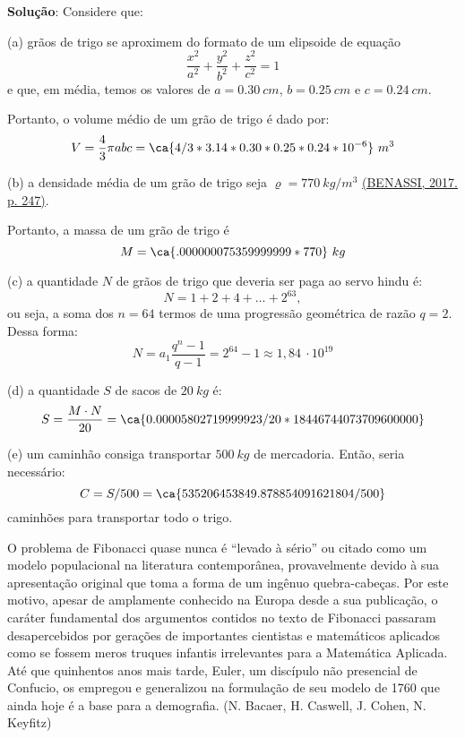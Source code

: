 {
\def\atrigo{0.30}%
\def\btrigo{0.25}%
\def\ctrigo{0.24}%

\color{red}
\textbf{Solução}: Considere que:

(a) grãos de trigo se aproximem do formato de um elipsoide de equação
\[\dfrac{x^2}{a^2} + \dfrac{y^2}{b^2} + \dfrac{z^2}{c^2} = 1\]
e que, em média, temos os valores de \(a = \atrigo\ cm\), \(b = \btrigo\ cm\) e \(c = \ctrigo\ cm\).

Portanto, o volume médio de um grão de trigo é dado por:
\[V = \dfrac{4}{3}\pi abc = \ca{4/3*3.14*\atrigo*\btrigo*\ctrigo*10^{-6}}\ m^3\]
\def\vtrigo{.000000075359999999} %
\def\dtrigo{770} %

(b) a densidade média de um grão de trigo seja \(\varrho = 770\ kg/m^3\) \href{https://ainfo.cnptia.embrapa.br/digital/bitstream/item/161751/1/246.pdf}{(BENASSI, 2017. p. 247)}.%

Portanto, a massa de um grão de trigo é
\[M = \ca{\vtrigo*\dtrigo}\ kg\]
\def\mtrigo{0.00005802719999923}

(c) a quantidade \(N\) de grãos de trigo que deveria ser paga ao servo hindu é:
\[N = 1+2+4+\ldots+2^{63},\]
ou seja, a soma dos \(n = 64\) termos de uma progressão geométrica de razão \(q = 2\). Dessa forma:
\[
N
= a_1 \dfrac{q^n-1}{q-1}
= 2^{64}-1 \approx 1,84\ \cdot 10^{19}
\]

\def\ntrigo{18446744073709600000}
(d) a quantidade \(S\) de sacos de \(20\ kg\) é:
\[S = \dfrac{M \cdot N}{20} = \ca{\mtrigo/20*\ntrigo}\]
\def\strigo{535206453849.878854091621804}

\def\kcaminhao{500}
(e) um caminhão consiga transportar \(\kcaminhao\ kg\) de mercadoria. Então, seria necessário:
\[C = S/500 = \ca{\strigo/\kcaminhao}\]
caminhões para transportar todo o trigo.
}

    O problema de Fibonacci quase nunca é ``levado à sério'' ou citado como um modelo populacional na literatura contemporânea, provavelmente devido à sua apresentação original que toma a forma de um ingênuo quebra-cabeças. Por este motivo, apesar de amplamente conhecido na Europa desde a sua publicação, o caráter fundamental dos argumentos contidos no texto de Fibonacci passaram desapercebidos por gerações de importantes cientistas e matemáticos aplicados como se fossem meros truques infantis irrelevantes para a Matemática Aplicada. Até que quinhentos anos mais tarde, Euler, um discípulo não presencial de Confucio, os empregou e generalizou na formulação de seu modelo de 1760 que ainda hoje é a base para a demografia. (N. Bacaer, H. Caswell, J. Cohen, N. Keyfitz)

